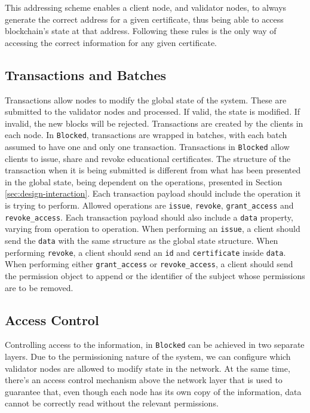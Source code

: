 This addressing scheme enables a client node, and validator nodes, to always generate the correct address for a given certificate, thus being able to access blockchain's state at that address. Following these rules is the only way of accessing the correct information for any given certificate.

\subsection{Transactions and Batches}
\label{sec:design-transactions}

Transactions allow nodes to modify the global state of the system. These are submitted to the validator nodes and processed. If valid, the state is modified. If invalid, the new blocks will be rejected. Transactions are created by the clients in each node. In \texttt{Blocked}, transactions are wrapped in batches, with each batch assumed to have one and only one transaction. Transactions in \texttt{Blocked} allow clients to issue, share and revoke educational certificates. The structure of the transaction when it is being submitted is different from what has been presented in the global state, being dependent on the operations, presented in Section \ref{sec:design-interaction}. Each transaction payload should include the operation it is trying to perform. Allowed operations are \texttt{issue}, \texttt{revoke}, \texttt{grant\_access} and \texttt{revoke\_access}. Each transaction payload should also include a \texttt{data} property, varying from operation to operation. When performing an \texttt{issue}, a client should send the \texttt{data} with the same structure as the global state structure. When performing \texttt{revoke}, a client should send an \texttt{id} and \texttt{certificate} inside \texttt{data}. When performing either \texttt{grant\_access} or \texttt{revoke\_access}, a client should send the permission object to append or the identifier of the subject whose permissions are to be removed.

\subsection{Access Control}
\label{sec:design-ac}

Controlling access to the information, in \texttt{Blocked} can be achieved in two separate layers. Due to the permissioning nature of the system, we can configure which validator nodes are allowed to modify state in the network. At the same time, there's an access control mechanism above the network layer that is used to guarantee that, even though each node has its own copy of the information, data cannot be correctly read without the relevant permissions.

